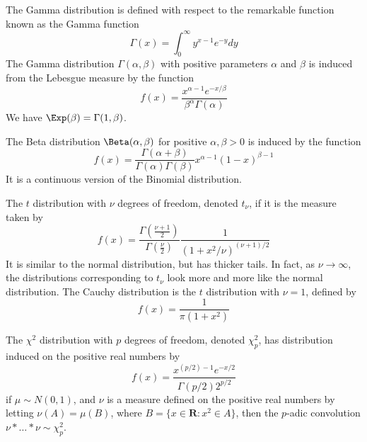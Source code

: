 \begin{example}
    The Gamma distribution is defined with respect to the remarkable function known as the Gamma function
    \[ \Gamma(x) = \int_0^\infty y^{x-1} e^{-y} dy \]
    The Gamma distribution $\Gamma(\alpha, \beta)$ with positive parameters $\alpha$ and $\beta$ is induced from the Lebesgue measure by the function
    \[ f(x) = \frac{x^{\alpha-1} e^{-x/\beta}}{\beta^\alpha \Gamma(\alpha)} \]
    We have $\Exp(\beta) = \Gamma(1,\beta)$.
\end{example}

\begin{example}
    The Beta distribution $\Beta(\alpha, \beta)$ for positive $\alpha, \beta > 0$ is induced by the function
    \[ f(x) = \frac{\Gamma(\alpha + \beta)}{\Gamma(\alpha) \Gamma(\beta)} x^{\alpha-1} (1 - x)^{\beta - 1} \]
    It is a continuous version of the Binomial distribution.
\end{example}

\begin{example}
    The $t$ distribution with $\nu$ degrees of freedom, denoted $t_\nu$, if it is the measure taken by
    \[ f(x) = \frac{\Gamma(\frac{\nu + 1}{2})}{\Gamma(\frac{\nu}{2})} \frac{1}{(1 + x^2/\nu)^{(\nu+1)/2}} \]
    It is similar to the normal distribution, but has thicker tails. In fact, as $\nu \to \infty$, the distributions corresponding to $t_\nu$ look more and more like the normal distribution. The Cauchy distribution is the $t$ distribution with $\nu = 1$, defined by
    \[ f(x) = \frac{1}{\pi(1 + x^2)} \]
\end{example}

\begin{example}
    The $\chi^2$ distribution with $p$ degrees of freedom, denoted $\chi_p^2$, has distribution induced on the positive real numbers by
    \[ f(x) = \frac{x^{(p/2) - 1} e^{-x/2}}{\Gamma(p/2) 2^{p/2}} \]
    if $\mu \sim N(0, 1)$, and $\nu$ is a measure defined on the positive real numbers by letting $\nu(A) = \mu(B)$, where $B = \{ x \in \mathbf{R}: x^2 \in A \}$, then the $p$-adic convolution $\nu * \dots * \nu \sim \chi_p^2$.
\end{example}